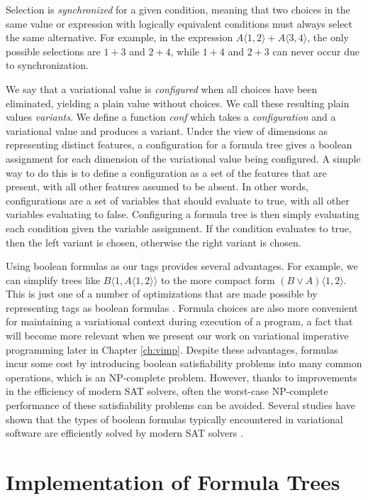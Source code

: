 \documentclass[12pt,oneside]{book}
\newcommand{\tagtree}[3]{#1 \langle #2, #3 \rangle}
\begin{document}
Selection is \emph{synchronized} for a given
condition, meaning that two choices in the same value or expression with logically equivalent conditions must always
select the same alternative. For example, in the expression $\tagtree{A}{1}{2}+\tagtree{A}{3}{4}$,
the only possible selections are $1+3$ and $2+4$, while $1+4$ and $2+3$ can never occur due
to synchronization.

We say that a variational value is \emph{configured} when all choices
have been eliminated, yielding a plain value without choices. We call these resulting plain values
\emph{variants}. We define a function \emph{conf} which takes a
\emph{configuration} and a variational value and produces a variant. Under the view of dimensions as representing distinct features, a configuration for a formula tree gives
a boolean assignment for each dimension of the variational value being configured.
A simple way to do this is to define a configuration as a set of the features that are present, with all
other features assumed to be absent. In other words, configurations are a set of variables that should
evaluate to true, with all other variables evaluating to false. Configuring a formula tree is then simply evaluating
each condition given the variable assignment. If the condition evaluates to true, then the left variant
is chosen, otherwise the right variant is chosen.

Using boolean formulas as our tags provides several advantages. For example, we can simplify trees like
$\tagtree{B}{1}{\tagtree{A}{1}{2}}$ to the more compact form $\tagtree{(B \vee A)}{1}{2}$. This is just
one of a number of optimizations that are made possible by representing tags as boolean formulas
\cite{WO14gpce,HW16fosd}. Formula choices are also more convenient
for maintaining a variational context during execution of a program, a fact that will become
more relevant when we present our work on variational imperative programming later in
Chapter \ref{ch:vimp}. Despite these advantages, formulas incur some cost by introducing boolean
satisfiability problems into many common operations, which is an NP-complete problem. However, thanks to improvements in the
efficiency of modern SAT solvers, often the worst-case NP-complete performance of these satisfiability
problems can be avoided. Several studies have shown that the types of boolean formulas typically encountered in
variational software are efficiently solved by modern SAT solvers \cite{liebig2013scalable,Mendonca:2009:SAF:1753235.1753267}.

\section{Implementation of Formula Trees}
\label{sec:genvimpl}
\end{document}
